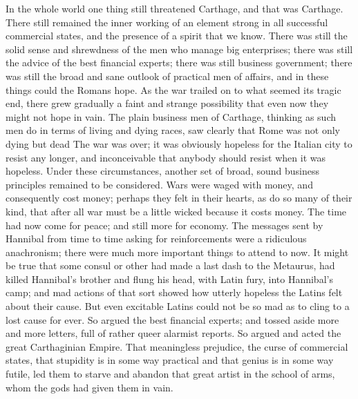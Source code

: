 In the whole world one thing still threatened Carthage, and that was Carthage. There still remained the inner working of an element strong in all successful commercial states, and the presence of a spirit that we know. There was still the solid sense and shrewdness of the men who manage big enterprises; there was still the advice of the best financial experts; there was still business government; there was still the broad and sane outlook of practical men of affairs, and in these things could the Romans hope. As the war trailed on to what seemed its tragic end, there grew gradually a faint and strange possibility that even now they might not hope in vain. The plain business men of Carthage, thinking as such men do in terms of living and dying races, saw clearly that Rome was not only dying but dead The war was over; it was obviously hopeless for the Italian city to resist any longer, and inconceivable that anybody should resist when it was hopeless. Under these circumstances, another set of broad, sound business principles remained to be considered. Wars were waged with money, and consequently cost money; perhaps they felt in their hearts, as do so many of their kind, that after all war must be a little wicked because it costs money. The time had now come for peace; and still more for economy. The messages sent by Hannibal from time to time asking for reinforcements were a ridiculous anachronism; there were much more important things to attend to now. It might be true that some consul or other had made a last dash to the Metaurus, had killed Hannibal's brother and flung his head, with Latin fury, into Hannibal's camp; and mad actions of that sort showed how utterly hopeless the Latins felt about their cause. But even excitable Latins could not be so mad as to cling to a lost cause for ever. So argued the best financial experts; and tossed aside more and more letters, full of rather queer alarmist reports. So argued and acted the great Carthaginian Empire. That meaningless prejudice, the curse of commercial states, that stupidity is in some way practical and that genius is in some way futile, led them to starve and abandon that great artist in the school of arms, whom the gods had given them in vain.

